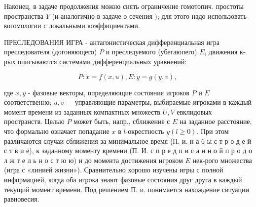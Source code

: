 \documentclass[10pt]{article}
\begin{document}
Наконец, в задаче продолжения можно снять ограничение гомотопич. простоты пространства $Y$ (и аналогично в задаче о сечения $)$; для этого надо использовать когомологии с локальными коэффициентами.



ПРЕСЛЕДОВАНИЯ ИГРА - антагонистическая дифференциальная игра преследователя (догоняющего) $P$ и преследуемого (убегаюпего) $E$, движения к-рых описываются системами дифференциальных уравнений:



\[

P: \dot{x}=f(x, u), E: \dot{y}=g(y, v) \text {, }

\]



где $x, y$ - фазовые векторы, определяющие состояния игроков $P$ и $E$ соответственно; $u, v-$ управляющие параметры, выбираемые игроками в каждый момент времени из заданных компактных множеств $U, V$ евклидовых пространств. Целью $P$ может быть, напр., сближение с $E$ на заданное расстояние, что формально означает попадание $x$ в $l$-окрестность $y(l \geqslant 0)$. При этом различаются случаи сближения за минимальное время (П. и. н а 6 ы с т р о д е й с т в и е), к заданному моменту времени (П. И. с п р е д п и с а н н о й п р о д о л ж т е л ь н о с т ю ю) и до момента достижения игроком $E$ нек-рого множества (игра с «линией жизни»). Сравнительно хорошо изучены игры с полной информацией, когда оба игрока знают фазовые состояния друг друга в каждый текущий момент времени. Под решением П. и. понимается нахождение ситуации равновесия.
\end{document}
